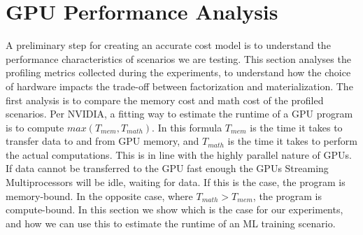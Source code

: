 \section{GPU Performance Analysis}
\label{sec:5-gpu-performance-analysis}
A preliminary step for creating an accurate cost model is to understand the performance characteristics of scenarios we are testing. This section analyses the profiling metrics collected during the experiments, to understand how the choice of hardware impacts the trade-off between factorization and materialization. The first analysis is to compare the memory cost and math cost of the profiled scenarios. Per NVIDIA, a fitting way to estimate the runtime of a GPU program is to compute $max(T_{mem}, T_{math})$. In this formula $T_{mem}$ is the time it takes to transfer data to and from GPU memory, and $T_{math}$ is the time it takes to perform the actual computations. This is in line with the highly parallel nature of GPUs. If data cannot be transferred to the GPU fast enough the GPUs Streaming Multiprocessors will be idle, waiting for data. If this is the case, the program is memory-bound. In the opposite case, where $T_{math} > T_{mem}$, the program is compute-bound. In this section we show which is the case for our experiments, and how we can use this to estimate the runtime of an ML training scenario.

